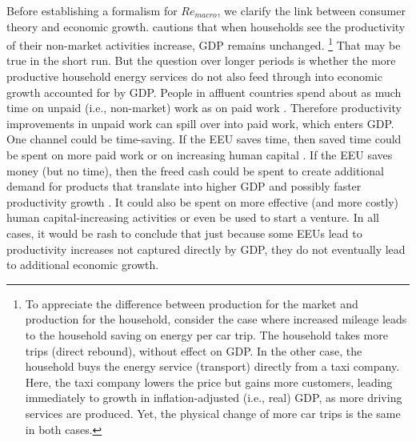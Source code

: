 \documentclass[12pt]{article}\usepackage[]{graphicx}\usepackage[]{xcolor}
\begin{document}
Before establishing a formalism for $Re_{macro}$, 
we clarify the link between consumer theory
and economic growth.
\citet{Turner:2013aa} cautions that when households
see the productivity of their non-market activities increase,
GDP remains unchanged.%
\footnote{
  To appreciate the difference between production for
  the market and production for the household, 
  consider the case
  where increased mileage leads to the household saving
  on energy per car trip. 
  The household takes more trips
  (direct rebound), without effect on GDP.
  In the other case, 
  the household buys the energy service
  (transport) directly from a taxi company. 
  Here, the taxi company lowers the price but gains more customers, 
  leading immediately to growth in inflation-adjusted (i.e., real) GDP,
  as more driving services are produced. 
  Yet, the physical change of more car trips is the same in both cases.
}
%
That may be true in the short run. 
But the question over longer periods is whether the more productive
household energy services do not also feed through into economic
growth accounted for by GDP.
People in affluent countries spend about as much time on
unpaid (i.e., non-market) work as on paid work \citep{Folbre2021}.
Therefore productivity improvements in unpaid work can spill over
into paid work, which enters GDP.
One channel could be time-saving. 
If the EEU saves time,
then saved time could be spent on more paid work or
on increasing human capital \citep{Sorrell2008,Gautham2024}.
If the EEU saves money (but no time), 
then the freed cash could be spent to create additional demand for products
that translate into higher GDP and possibly faster productivity growth
\citep{Magacho2018}. It could also be spent on more effective 
(and more costly) human capital-increasing activities
or even be used to start a venture. 
In all cases, it would be rash to conclude that 
just because some EEUs lead to productivity increases
not captured directly by GDP,
they do not eventually lead to additional economic growth.
\end{document}
